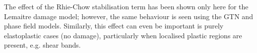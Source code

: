 \documentclass[sn-mathphys,Numbered]{sn-jnl}%
\begin{document}
The effect of the Rhie-Chow stabilisation term has been shown only here for the Lemaitre damage model; however, the same behaviour is seen using the GTN and phase field models.
Similarly, this effect can even be important is purely elastoplastic cases (no damage), particularly when localised plastic regions are present, e.g. shear bands.



\end{document}
